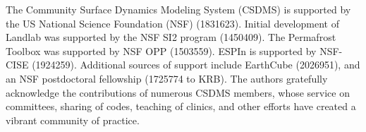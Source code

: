\documentclass[journal abbreviation, manuscript]{copernicus}
\begin{document}



\begin{acknowledgements}
The Community Surface Dynamics Modeling System (CSDMS) is supported by the US National Science Foundation (NSF) (1831623). Initial development of Landlab was supported by the NSF SI2 program (1450409). The Permafrost Toolbox was supported by NSF OPP (1503559). ESPIn is supported by NSF-CISE (1924259). Additional sources of support include EarthCube (2026951), and an NSF postdoctoral fellowship (1725774 to KRB). The authors gratefully acknowledge the contributions of numerous CSDMS members, whose service on committees, sharing of codes, teaching of clinics, and other efforts have created a vibrant community of practice.
\end{acknowledgements}



\end{document}
